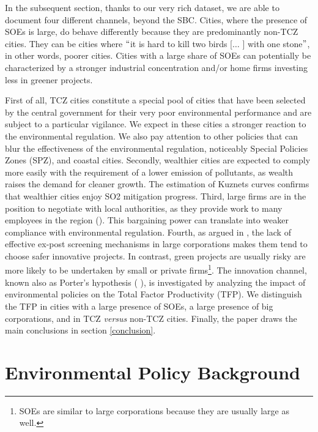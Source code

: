 \documentclass[12pt]{article}
\begin{document}
In the subsequent section, thanks to our very rich dataset, we are able to document four different channels, beyond the SBC. Cities, where the presence of SOEs is large, do behave differently because they are predominantly non-TCZ cities. They can be cities where $``$it is hard to kill two birds [$ \ldots $ ] with one stone$"$, in other words, poorer cities. Cities with a large share of SOEs can potentially be characterized by a stronger industrial concentration and/or home firms investing less in greener projects. 


First of all, TCZ cities constitute a special pool of cities that have been selected by the central government for their very poor environmental performance and are subject to a particular vigilance. We expect in these cities a stronger reaction to the environmental regulation. We also pay attention to other policies that can blur the effectiveness of the environmental regulation, noticeably Special Policies Zones (SPZ), and coastal cities. Secondly, wealthier cities are expected to comply more easily with the requirement of a lower emission of pollutants, as wealth raises the demand for cleaner growth. The estimation of Kuznets curves confirms that wealthier cities enjoy SO2 mitigation progress. Third, large firms are in the position to negotiate with local authorities, as they provide work to many employees in the region (\cite{Wang2003-ar}). This bargaining power can translate into weaker compliance with environmental regulation. Fourth, as argued in \cite{Huang1998-pi}, the lack of effective ex-post screening mechanisms in large corporations makes them tend to choose safer innovative projects. In contrast, green projects are usually risky are more likely to be undertaken by small or private firms\footnote{ SOEs are similar to large corporations because they are usually large as well.}. The innovation channel, known also as Porter's hypothesis ( \cite{Porter1995-vr}), is investigated by analyzing the impact of environmental policies on the Total Factor Productivity (TFP). We distinguish the TFP in cities with a large presence of SOEs, a large presence of big corporations, and in TCZ \textit{versus} non-TCZ cities. Finally, the paper draws the main conclusions in section \ref{conclusion}. 


\section{Environmental Policy Background} \label{policy} 
\end{document}
